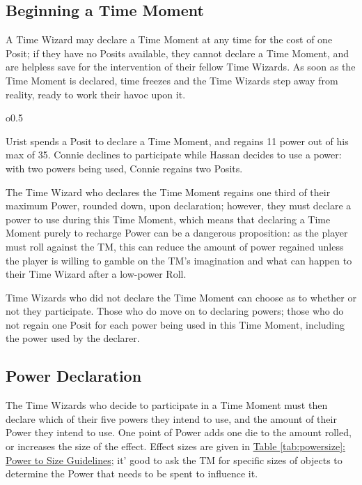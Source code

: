 \documentclass[twoside]{article}
\newenvironment{examplebox}[1]{\begin{tcolorbox}[colback=green!5!white,colframe=green!75!black,title={Example: #1}]}{\end{tcolorbox}\vspace{-30pt}}
\begin{document}
\subsection{Beginning a Time Moment} \label{ssec:begin-moment}
A Time Wizard may declare a Time Moment at any time for the cost of one Posit; if they have no
Posits available, they cannot declare a Time Moment, and are helpless save for the intervention
of their fellow Time Wizards. As soon as the Time Moment is declared, time freezes and the
Time Wizards step away from reality, ready to work their havoc upon it.

\begin{wrapfigure}{o}{0.5\textwidth}
   \vspace{-10pt}
   \begin{examplebox}{Beginning of a Time Moment}
      Urist spends a Posit to declare a Time Moment, and regains 11 power out of his max of 35.
      Connie declines to participate while Hassan decides to use a power: with two powers being
      used, Connie regains two Posits.
   \end{examplebox}
   \vspace{20pt}
\end{wrapfigure}

The Time Wizard who declares the Time Moment regains one third of their maximum Power, rounded
down, upon declaration; however, they must declare a power to use during this Time Moment, which
means that declaring a Time Moment purely to recharge Power can be a dangerous proposition: as
the player must roll against the TM, this can reduce the amount of power regained unless the
player is willing to gamble on the TM's imagination and what can happen to their Time Wizard
after a low-power Roll.

Time Wizards who did not declare the Time Moment can choose as to whether or not they
participate. Those who do move on to declaring powers; those who do not regain one Posit for
each power being used in this Time Moment, including the power used by the declarer.

\subsection{Power Declaration} \label{ssec:power-declaration}
The Time Wizards who decide to participate in a Time Moment must then declare which of their
five powers they intend to use, and the amount of their Power they intend to use. One point of
Power adds one die to the amount rolled, or increases the size of the effect. Effect sizes are
given in \hyperref[tab:powersize]{Table \ref*{tab:powersize}: Power to Size Guidelines}; it'
good to ask the TM for specific sizes of objects to determine the Power that needs to be spent
to influence it.
\end{document}
